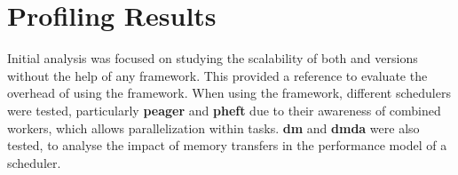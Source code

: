 \documentclass[main.tex]{subfiles}
\begin{document}
\chapter{Profiling Results} \label{chapter:results}


Initial analysis was focused on studying the scalability of both \cpu and \cuda versions without the help of any framework. This provided a reference to evaluate the overhead of using the framework. When using the \starpu framework, different schedulers were tested, particularly \textbf{peager} and \textbf{pheft} due to their awareness of combined workers, which allows \openmp parallelization within \cpu tasks. \textbf{dm} and \textbf{dmda} were also tested, to analyse the impact of memory transfers in the performance model of a scheduler.



%


\end{document}
